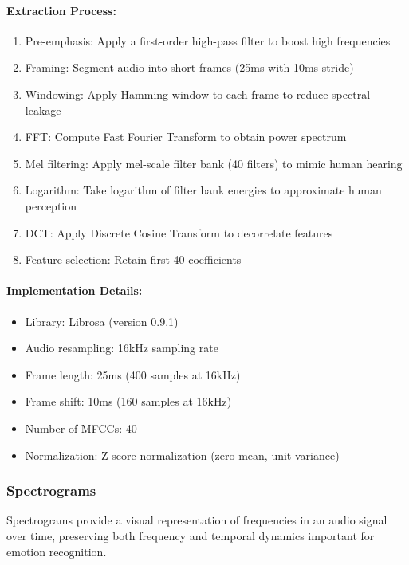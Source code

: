 \documentclass[12pt]{article}
\begin{document}
\paragraph{Extraction Process:}
\begin{enumerate}
    \item Pre-emphasis: Apply a first-order high-pass filter to boost high frequencies
    \item Framing: Segment audio into short frames (25ms with 10ms stride)
    \item Windowing: Apply Hamming window to each frame to reduce spectral leakage
    \item FFT: Compute Fast Fourier Transform to obtain power spectrum
    \item Mel filtering: Apply mel-scale filter bank (40 filters) to mimic human hearing
    \item Logarithm: Take logarithm of filter bank energies to approximate human perception
    \item DCT: Apply Discrete Cosine Transform to decorrelate features
    \item Feature selection: Retain first 40 coefficients
\end{enumerate}

\paragraph{Implementation Details:}
\begin{itemize}
    \item Library: Librosa (version 0.9.1)
    \item Audio resampling: 16kHz sampling rate
    \item Frame length: 25ms (400 samples at 16kHz)
    \item Frame shift: 10ms (160 samples at 16kHz)
    \item Number of MFCCs: 40
    \item Normalization: Z-score normalization (zero mean, unit variance)
\end{itemize}

\subsubsection{Spectrograms}
Spectrograms provide a visual representation of frequencies in an audio signal over time, preserving both frequency and temporal dynamics important for emotion recognition.
\end{document}
